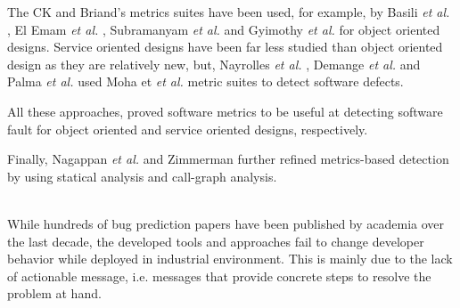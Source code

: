 \cite{Briand1999a}

The CK and Briand's metrics suites have been used, for example, by Basili \textit{et al.} \cite{Basili1996}, El Emam \textit{et al.} \cite{ElEmam2001},  Subramanyam \textit{et al.} \cite{Subramanyam2003} and Gyimothy \textit{et al.} \cite{Gyimothy2005} for object oriented designs.
Service oriented designs have been far less studied than object oriented design as they are relatively new, but, Nayrolles \textit{et al.} \cite{Nayrolles,Nayrolles2013d}, Demange \textit{et al.} \cite{demange2013} and Palma \textit{et al.} \cite{Palma2013} used Moha et \textit{et al.} metric suites to detect software defects.

All these approaches, proved software metrics to be useful at detecting software fault for object oriented and service oriented designs, respectively.

Finally, Nagappan \textit{et al.} \cite{Nagappan2005,Nagappan2006} and Zimmerman \cite{Zimmermann2007,Zimmermann2008} further refined metrics-based detection by using statical analysis and call-graph analysis.

\\
While hundreds of bug prediction papers have been published by academia over the last decade, the developed tools and approaches fail to change developer behavior while deployed in industrial environment\cite{Lewis2013}.
This is mainly due to the lack of actionable message, i.e. messages that provide concrete steps to resolve the problem at hand.
